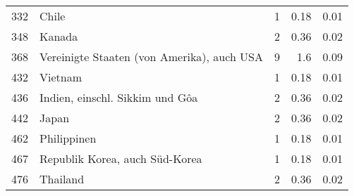 \begin{longtable}{lXrrr}
        332 & \multicolumn{1}{X}{Chile} & %
          \num{1} &
          \num[round-mode=places,round-precision=2]{0.18} &
          \num[round-mode=places,round-precision=2]{0.01} \\

        348 & \multicolumn{1}{X}{Kanada} & %
          \num{2} &
          \num[round-mode=places,round-precision=2]{0.36} &
          \num[round-mode=places,round-precision=2]{0.02} \\

        368 & \multicolumn{1}{X}{Vereinigte Staaten (von Amerika), auch USA} & %
          \num{9} &
          \num[round-mode=places,round-precision=2]{1.6} &
          \num[round-mode=places,round-precision=2]{0.09} \\

        432 & \multicolumn{1}{X}{Vietnam} & %
          \num{1} &
          \num[round-mode=places,round-precision=2]{0.18} &
          \num[round-mode=places,round-precision=2]{0.01} \\

        436 & \multicolumn{1}{X}{Indien, einschl. Sikkim und Gôa} & %
          \num{2} &
          \num[round-mode=places,round-precision=2]{0.36} &
          \num[round-mode=places,round-precision=2]{0.02} \\

        442 & \multicolumn{1}{X}{Japan} & %
          \num{2} &
          \num[round-mode=places,round-precision=2]{0.36} &
          \num[round-mode=places,round-precision=2]{0.02} \\

        462 & \multicolumn{1}{X}{Philippinen} & %
          \num{1} &
          \num[round-mode=places,round-precision=2]{0.18} &
          \num[round-mode=places,round-precision=2]{0.01} \\

        467 & \multicolumn{1}{X}{Republik Korea, auch Süd-Korea} & %
          \num{1} &
          \num[round-mode=places,round-precision=2]{0.18} &
          \num[round-mode=places,round-precision=2]{0.01} \\

        476 & \multicolumn{1}{X}{Thailand} & %
          \num{2} &
          \num[round-mode=places,round-precision=2]{0.36} &
          \num[round-mode=places,round-precision=2]{0.02} \\


\end{longtable}
